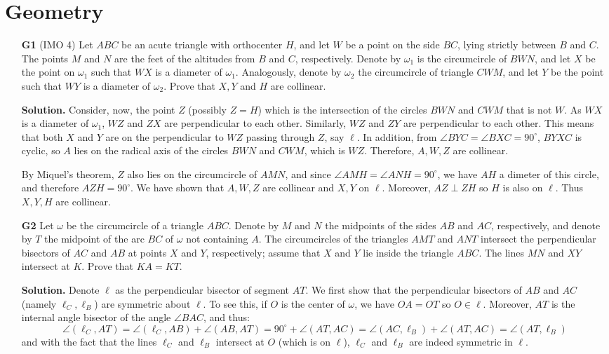 \documentclass[11pt,a4paper]{article}
\begin{document}
\section*{Geometry}
\begin{enumerate}
	\item [\textbf{G1}] (IMO 4) Let $ABC$ be an acute triangle with orthocenter $H$, and let $W$ be a point on the side $BC$, lying strictly between $B$ and $C$. The points $M$ and $N$ are the feet of the altitudes from $B$ and $C$, respectively. Denote by $\omega_1$ is the circumcircle of $BWN$, and let $X$ be the point on $\omega_1$ such that $WX$ is a diameter of $\omega_1$. Analogously, denote by $\omega_2$ the circumcircle of triangle $CWM$, and let $Y$ be the point such that $WY$ is a diameter of $\omega_2$. Prove that $X,Y$ and $H$ are collinear.
	
	\textbf{Solution.} Consider, now, the point $Z$ (possibly $Z=H$) which is the intersection of the circles $BWN$ and $CWM$ that is not $W$. As $WX$ is a diameter of $\omega_1$, $WZ$ and $ZX$ are perpendicular to each other. 
	Similarly, $WZ$ and $ZY$ are perpendicular to each other. This means that both $X$ and $Y$ are on the perpendicular to $WZ$ passing through $Z$, say $\ell$. 
	In addition, from $\angle BYC=\angle BXC=90^{\circ}$, $BYXC$ is cyclic, so $A$ lies on the radical axis of the circles $BWN$ and $CWM$, which is $WZ$. 
	Therefore, $A, W, Z$ are collinear. 
	
	By Miquel's theorem, $Z$ also lies on the circumcircle of $AMN$, and since $\angle AMH=\angle ANH=90^{\circ}$, we have $AH$ a dimeter of this circle, and therefore $AZH=90^{\circ}$. 
	We have shown that $A, W, Z$ are collinear and $X, Y$ on $\ell$. Moreover, $AZ\perp ZH$ so $H$ is also on $\ell$. Thus $X, Y, H$ are collinear. 
	
	\item[\textbf{G2}] Let $\omega$ be the circumcircle of a triangle $ABC$. Denote by $M$ and $N$ the midpoints of the sides $AB$ and $AC$, respectively, and denote by $T$ the midpoint of the arc $BC$ of $\omega$ not containing $A$. The circumcircles of the triangles $AMT$ and $ANT$ intersect the perpendicular bisectors of $AC$ and $AB$ at points $X$ and $Y$, respectively; assume that $X$ and $Y$ lie inside the triangle $ABC$. The lines $MN$ and $XY$ intersect at $K$. Prove that $KA=KT$.
	
	\textbf{Solution.} Denote $\ell$ as the perpendicular bisector of segment $AT$. We first show that the perpendicular bisectors of $AB$ and $AC$ (namely $\ell_C, \ell_B$) are symmetric about $\ell$. To see this, if $O$ is the center of $\omega$, we have $OA=OT$ so $O\in\ell$. Moreover, $AT$ is the internal angle bisector of the angle $\angle BAC$, and thus: 
	\[
	\angle(\ell_C, AT)
	=\angle(\ell_C, AB)+\angle(AB, AT)
	=90^{\circ} + \angle(AT, AC)
	=\angle (AC, \ell_B)+\angle (AT, AC)
	=\angle (AT, \ell_B)
	\]
	and with the fact that the lines $\ell_C$ and $\ell_B$ intersect at $O$ (which is on $\ell$), $\ell_C$ and $\ell_B$ are indeed symmetric in $\ell$. 
	

\end{enumerate}
\end{document}
